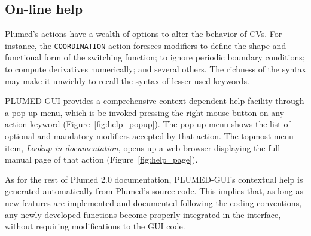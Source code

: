 \documentclass[preprint,12pt]{elsarticle}
\begin{document}
\subsection{On-line help}

Plumed's actions have a wealth of options to alter the
behavior of CVs. For instance, the \texttt{COORDINATION} action
foresees modifiers to define the shape and functional form of the
switching function; to ignore periodic boundary conditions; to compute
derivatives numerically; and several others. The richness of the
syntax may make it unwieldy to recall the syntax of lesser-used
keywords.


PLUMED-GUI provides a comprehensive context-dependent help facility
through a pop-up menu, which is be invoked pressing the right mouse
button on any action keyword (Figure~\ref{fig:help_popup}). The pop-up
menu shows the list of optional and mandatory modifiers accepted by
that action.  The topmost menu item, \emph{Lookup in documentation},
opens up a web browser  displaying the full manual page of that action
(Figure~\ref{fig:help_page}).

As for the rest of Plumed 2.0 documentation, PLUMED-GUI's contextual
help is generated automatically from Plumed's source code.  This
implies that, as long as new features are implemented and documented
following the coding conventions, any newly-developed functions become
properly integrated in the interface, without requiring modifications
to the GUI code.


\end{document}
